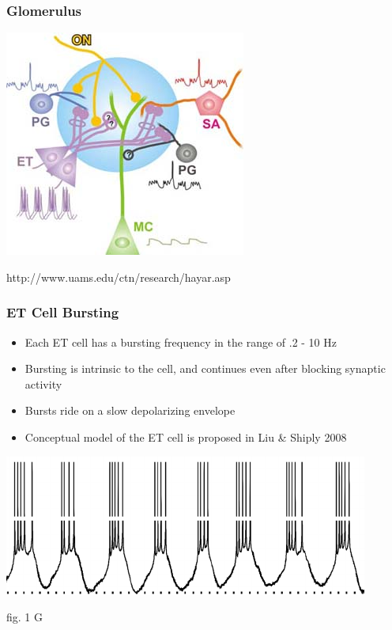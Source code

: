 \documentclass{beamer}
\theoremstyle{plain}
\theoremstyle{definition}
\begin{document}
\begin{frame}\frametitle{Glomerulus}
  \begin{center}
   \includegraphics[scale = 2.6]{glomerulus.jpg}
  \end{center}
  http://www.uams.edu/ctn/research/hayar.asp
\end{frame}

\begin{frame}\frametitle{ET Cell Bursting}
 \begin{itemize}
  \item Each ET cell has a bursting frequency in the range of .2 - 10 Hz
  \item Bursting is intrinsic to the cell, and continues even after blocking synaptic activity
  \item Bursts ride on a slow depolarizing envelope
  \item Conceptual model of the ET cell is proposed in Liu \& Shiply 2008 \cite{liu_multiple_2008}
 \end{itemize}
 \begin{center}
  \includegraphics[scale = .4]{trace.png}
 \end{center}
 fig. 1 G
\end{frame}
\end{document}
